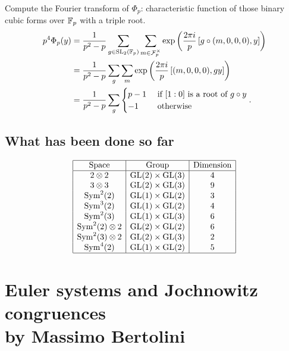 \documentclass[12pt,amsfont]{amsart}
\begin{document}
Compute the Fourier transform of $\Phi_p$: characteristic function of those binary cubic forms over ${\mathbb F}_p$ with a triple root. 
\begin{align*} p^4 \Phi_p(y) & = \frac{1}{p^2 - p} \sum_{g \in \operatorname{SL}_2({\mathbb F}_p)} \sum_{m \in \mathcal{F}_p^\times} \exp\left(\frac{2 \pi i}{p} \left[ g \circ (m, 0, 0, 0), y \right]\right) \\
& = \frac{1}{p^2 - p} \sum_g \sum_m \exp\left(\frac{2 \pi i}{p} \left[(m, 0, 0, 0), gy \right] \right) \\
& = \frac{1}{p^2 - p} \sum_g \begin{cases} p-1 & \text{ if } [1:0] \text{ is a root of } g \circ y \\ -1 & \text{ otherwise } \end{cases}. 
\end{align*}

\subsection{What has been done so far}

\[ \begin{array}{|c|c|c|} 
\hline
\text{Space} & \text{Group} & \text{Dimension} \\
\hline
2 \otimes 2 & \operatorname{GL}(2) \times \operatorname{GL}(3) & 4 \\
3 \otimes 3 & \operatorname{GL}(2) \times \operatorname{GL}(3) & 9\\
\operatorname{Sym}^2(2) & \operatorname{GL}(1) \times \operatorname{GL}(2) & 3\\
\operatorname{Sym}^3(2) & \operatorname{GL}(1) \times \operatorname{GL}(2) & 4\\
\operatorname{Sym}^2(3) & \operatorname{GL}(1) \times \operatorname{GL}(3) & 6\\
\operatorname{Sym}^2(2) \otimes 2 & \operatorname{GL}(2) \times \operatorname{GL}(2) & 6 \\
\operatorname{Sym}^2(3) \otimes 2 & \operatorname{GL}(2) \times \operatorname{GL}(3) & 2\\
\operatorname{Sym}^4(2) & \operatorname{GL}(1) \times \operatorname{GL}(2) & 5 \\
\hline
\end{array}
\]
\renewcommand{\thesubsection}{\arabic{section}.R}
\begingroup
\renewcommand{\addcontentsline}[3]{}%
\endgroup

\newpage
\section{Euler systems and Jochnowitz congruences \\
by Massimo Bertolini}\label{10}
\renewcommand{\thesubsection}{\arabic{section}.\arabic{subsection}}
\end{document}
